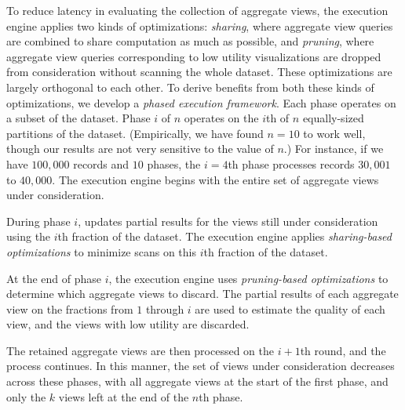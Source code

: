 To reduce latency in 
evaluating the collection of aggregate views, 
the \SeeDB execution engine  
applies two kinds of optimizations:
{\em sharing}, where aggregate view queries are combined to share computation
as much as possible, and {\em pruning}, where aggregate view queries
corresponding to low utility visualizations are dropped from consideration without scanning the whole
dataset.
These optimizations are largely orthogonal to each other.
To derive benefits from both these kinds of optimizations,
we develop a {\em phased execution framework}.
Each phase operates on a subset of the dataset.
Phase $i$ of $n$ operates on the $i$th of $n$ equally-sized partitions of the dataset. 
(Empirically, we have found $n=10$ to
work well, though our results are not very sensitive to the value
of $n$.) 
For instance, if we have $100,000$ records and $10$ phases,
the $i = 4$th phase processes records $30,001$ to $40,000$.
The execution engine begins 
with the entire set of aggregate views under consideration.
\begin{denselist}
\item During phase $i$, \SeeDB updates partial results
for the views
still under consideration using the $i$th fraction of the dataset.
The execution engine applies {\em sharing-based optimizations}
to minimize scans on this  $i$th fraction of the dataset.
\item At the end of phase $i$, the execution engine uses 
{\em pruning-based optimizations} to determine which aggregate views to discard.
The partial results of each aggregate view on the fractions from $1$ through $i$ are used to 
estimate the quality of each view, and the views with low utility are discarded. 
\end{denselist}
The retained aggregate views are then processed on the $i+1$th round,
and the process continues. 
In this manner, the set of views under consideration
decreases across these phases, with all aggregate views at the start 
of the first phase, and only the $k$ views left
at the end of the $n$th phase.

